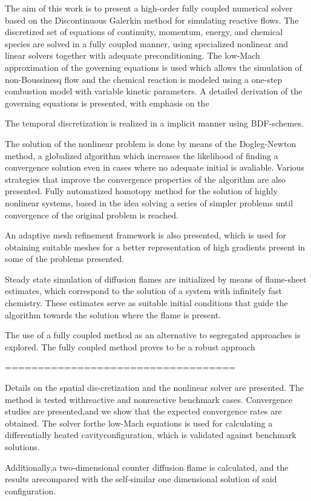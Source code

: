 The aim of this work is to present a high-order fully coupled numerical solver based on the Discontinuous Galerkin method for simulating reactive flows. The discretized set of equations of continuity, momentum, energy, and chemical species are solved in a fully coupled manner, using specialized nonlinear and linear solvers together with adequate preconditioning. The low-Mach approximation of the governing equations is used which allows the simulation of non-Boussinesq flow and the chemical reaction is modeled using a one-step combustion model with variable kinetic parameters.
A detailed derivation of the governing equations is presented, with emphasis on the 

 The temporal discretization is realized in a implicit manner using BDF-schemes. 






The solution of the nonlinear problem is done by means of the Dogleg-Newton method, a globalized algorithm which increases the likelihood of finding a convergence solution even in cases where no adequate initial is avaliable. Various strategies that improve the convergence properties of the algorithm are also presented. 
Fully automatized homotopy method for the solution of highly nonlinear systems, based in the idea solving a series of simpler problems until convergence of the original problem is reached.

An adaptive mesh refinement framework is also presented, which is used for obtaining suitable meshes for a better representation of high gradients present in some of the problems presented.

Steady state simulation of diffusion flames are initialized by means of flame-sheet estimates, which correspond to the solution of a system with infinitely fast chemistry. These estimates serve as suitable initial conditions that guide the algorithm towards the solution where the flame is present.



The use of a fully coupled method as an alternative to segregated approaches is explored. 
The fully coupled method proves to be a robust approach 

===================================

 Details on the spatial dis-cretization and the nonlinear solver are presented. 
 The method is tested withreactive and nonreactive benchmark cases. Convergence studies are presented,and we show that the expected convergence rates are obtained. 
 The solver forthe low-Mach equations is used for calculating a differentially heated cavityconfiguration, which is validated against benchmark solutions. 
 
 Additionally,a two-dimensional counter diffusion flame is calculated, and the results arecompared with the self-similar one dimensional solution of said configuration.

